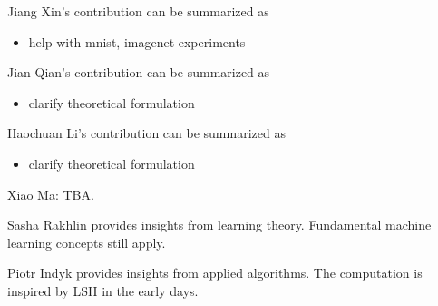 \documentclass[11pt]{article} 	%
\theoremstyle{definition}
\begin{document}
Jiang Xin's contribution can be summarized as
\begin{itemize}
	\item help with mnist, imagenet experiments
\end{itemize}

Jian Qian's contribution can be summarized as
\begin{itemize}
	\item clarify theoretical formulation
\end{itemize}

Haochuan Li's contribution can be summarized as
\begin{itemize}
	\item clarify theoretical formulation
\end{itemize}

Xiao Ma: TBA.

Sasha Rakhlin provides insights from learning theory. Fundamental machine learning concepts still apply.

Piotr Indyk provides insights from applied algorithms. The computation is inspired by LSH in the early days.
\end{document}
